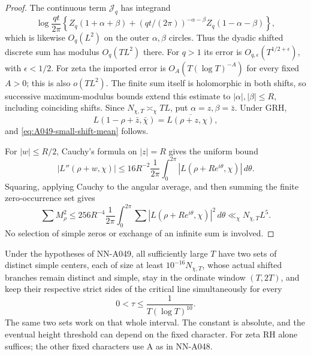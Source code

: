 \begin{proof}
The continuous term \(\mathcal J_q\) has integrand
\[
 \log\frac{qt}{2\pi}
 \left\{Z_q(1+\alpha+\beta)
 +(qt/(2\pi))^{-\alpha-\beta}Z_q(1-\alpha-\beta)\right\},
\]
which is likewise \(O_q(L^2)\) on the outer
\(\alpha,\beta\) circles. Thus the dyadic shifted discrete
sum has modulus \(O_q(TL^2)\) there. For \(q>1\) its error is
\(O_{q,\epsilon}(T^{1/2+\epsilon})\), with \(\epsilon<1/2\).
For zeta the imported error is
\(O_A(T(\log T)^{-A})\) for every fixed \(A>0\);
this is also \(o(TL^2)\). The finite sum itself
is holomorphic in both shifts, so successive maximum-modulus
bounds extend this estimate to
\(|\alpha|,|\beta|\le R\), including coinciding shifts.
Since \(N_{\chi,T}\asymp_\chi TL\), put
\(\alpha=z,\beta=\bar z\). Under GRH,
\[
 L(1-\rho+\bar z,\bar\chi)
                         =\overline{L(\rho+z,\chi)},
\]
and \eqref{eq:A049-small-shift-mean} follows.

For \(|w|\le R/2\), Cauchy's formula on \(|z|=R\)
gives the uniform bound
\[
 |L''(\rho+w,\chi)|
 \le16R^{-2}\frac1{2\pi}\int_0^{2\pi}
                    |L(\rho+Re^{i\theta},\chi)|\,d\theta .
\]
Squaring, applying Cauchy to the angular average, and
then summing the finite zero-occurrence set gives
\[
 \sum M_\rho^2
 \le256R^{-4}\frac1{2\pi}\int_0^{2\pi}
           \sum|L(\rho+Re^{i\theta},\chi)|^2\,d\theta
 \ll_\chi N_{\chi,T}L^5.
\]
No selection of simple zeros or exchange of an infinite
sum is involved.
\end{proof}

\begin{corollary}
\label{cor:A049-logarithmic-time}
Under the hypotheses of NN-A049, all sufficiently large
\(T\) have two sets of distinct simple centers, each of
size at least \(10^{-16}N_{\chi,T}\), whose actual shifted
branches remain distinct and simple, stay in the ordinate
window \((T,2T)\), and keep their respective strict sides
of the critical line simultaneously for every
\[
                         0<\tau\le\frac1{T(\log T)^{10}}.
\]
The same two sets work on that whole interval. The
constant is absolute, and the eventual height threshold
can depend on the fixed character. For zeta RH alone
suffices; the other fixed characters use A as in NN-A048.
\end{corollary}

